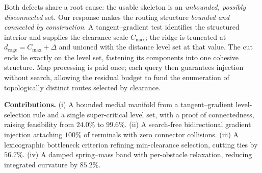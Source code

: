 \documentclass[conference]{IEEEtran}
\begin{document}
Both defects share a root cause: the usable skeleton is an \emph{unbounded, possibly disconnected} set. Our response makes the routing structure \emph{bounded and connected by construction}. A tangent--gradient test identifies the structured interior and supplies the clearance scale $C_{\max}$; the ridge is truncated at $d_{\mathrm{cage}}=C_{\max}+\Delta$ and unioned with the distance level set at that value. The cut ends lie exactly on the level set, fastening its components into one cohesive structure. Map processing is paid once; each query then guarantees injection without search, allowing the residual budget to fund the enumeration of topologically distinct routes selected by clearance.

\textbf{Contributions.} (i) A bounded medial manifold from a tangent--gradient level-selection rule and a single super-critical level set, with a proof of connectedness, raising feasibility from $24.0\%$ to $99.6\%$. (ii) A search-free bidirectional gradient injection attaching $100\%$ of terminals with zero connector collisions. (iii) A lexicographic bottleneck criterion refining min-clearance selection, cutting ties by $56.7\%$. (iv) A damped spring--mass band with per-obstacle relaxation, reducing integrated curvature by $85.2\%$.






\end{document}

